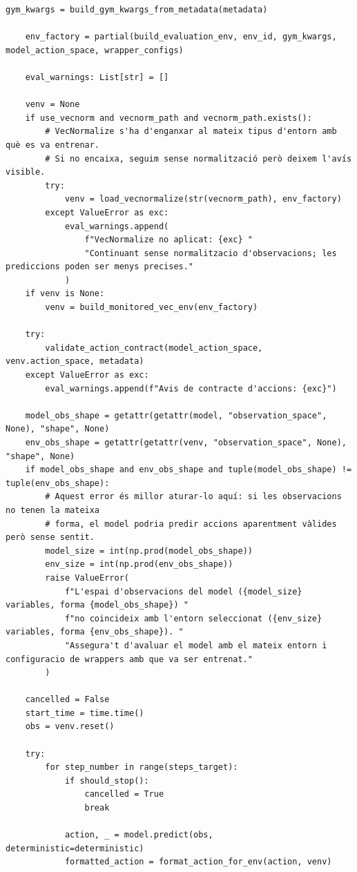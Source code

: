 \documentclass[10pt,a4paper]{article}
\begin{document}
\begin{lstlisting}[style=studioPython,caption={backend/avaluar\_agent\_backend.py},label={lst:backend-avaluar-agent-backend-py}]
    gym_kwargs = build_gym_kwargs_from_metadata(metadata)

    env_factory = partial(build_evaluation_env, env_id, gym_kwargs, model_action_space, wrapper_configs)

    eval_warnings: List[str] = []

    venv = None
    if use_vecnorm and vecnorm_path and vecnorm_path.exists():
        # VecNormalize s'ha d'enganxar al mateix tipus d'entorn amb què es va entrenar.
        # Si no encaixa, seguim sense normalització però deixem l'avís visible.
        try:
            venv = load_vecnormalize(str(vecnorm_path), env_factory)
        except ValueError as exc:
            eval_warnings.append(
                f"VecNormalize no aplicat: {exc} "
                "Continuant sense normalitzacio d'observacions; les prediccions poden ser menys precises."
            )
    if venv is None:
        venv = build_monitored_vec_env(env_factory)

    try:
        validate_action_contract(model_action_space, venv.action_space, metadata)
    except ValueError as exc:
        eval_warnings.append(f"Avis de contracte d'accions: {exc}")

    model_obs_shape = getattr(getattr(model, "observation_space", None), "shape", None)
    env_obs_shape = getattr(getattr(venv, "observation_space", None), "shape", None)
    if model_obs_shape and env_obs_shape and tuple(model_obs_shape) != tuple(env_obs_shape):
        # Aquest error és millor aturar-lo aquí: si les observacions no tenen la mateixa
        # forma, el model podria predir accions aparentment vàlides però sense sentit.
        model_size = int(np.prod(model_obs_shape))
        env_size = int(np.prod(env_obs_shape))
        raise ValueError(
            f"L'espai d'observacions del model ({model_size} variables, forma {model_obs_shape}) "
            f"no coincideix amb l'entorn seleccionat ({env_size} variables, forma {env_obs_shape}). "
            "Assegura't d'avaluar el model amb el mateix entorn i configuracio de wrappers amb que va ser entrenat."
        )

    cancelled = False
    start_time = time.time()
    obs = venv.reset()

    try:
        for step_number in range(steps_target):
            if should_stop():
                cancelled = True
                break

            action, _ = model.predict(obs, deterministic=deterministic)
            formatted_action = format_action_for_env(action, venv)


\end{lstlisting}
\end{document}
